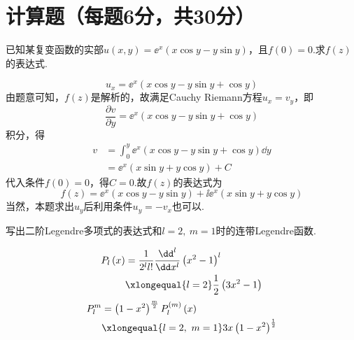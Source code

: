 \section{计算题（每题6分，共30分）}
{
\begin{exercise}
    已知某复变函数的实部$u\left(x,y\right)=\ee^x\left(x\cos{y}-y\sin{y}\right)$，且$f\left(0\right)=0$.求$f\left(z\right)$的表达式.
\end{exercise}
\begin{solution}
    $$u_x=\ee^x\left(x\cos{y}-y\sin{y}+\cos{y}\right)$$
    由题意可知，$f\left(z\right)$是解析的，故满足Cauchy Riemann方程$u_x=v_y$，即
    $$\frac{\partial v}{\partial y}=\ee^x\left(x\cos{y}-y\sin{y}+\cos{y}\right)$$
    积分，得
    $$
    \begin{aligned}
    v&=\int_0^y{\ee^x\left(x\cos{y}-y\sin{y}+\cos{y}\right)}\dd y\\
    &=\ee^x\left(x\sin{y}+y\cos{y}\right)+C
    \end{aligned}
    $$
    代入条件$f\left(0\right)=0$，得$C=0$.故$f\left(z\right)$的表达式为
    $$f\left(z\right)=\ee^x\left(x\cos{y}-y\sin{y}\right)+\ii\ee^x\left(x\sin{y}+y\cos{y}\right)$$
    当然，本题求出$u_y$后利用条件$u_y=-v_x$也可以.
\end{solution}

\begin{exercise}
    写出二阶Legendre多项式的表达式和$l=2,\ m=1$时的连带Legendre函数.
\end{exercise}
\begin{solution}
    $$
    \begin{aligned}
    P_l\left(x\right)&=\frac{1}{2^ll!}\frac{\dd^l}{\dd x^l}\left(x^2-1\right)^l\\
    &\xlongequal{l=2}\frac{1}{2}\left(3x^2-1\right)
    \end{aligned}
    $$
    $$
    \begin{aligned}
    P_l^m&=\left(1-x^2\right)^{\frac{m}{2}}P_l^{\left(m\right)}\left(x\right)\\
    &\xlongequal{l=2,\ m=1}3x\left(1-x^2\right)^{\frac{1}{2}}
\end{aligned}
    $$
\end{solution}

}
